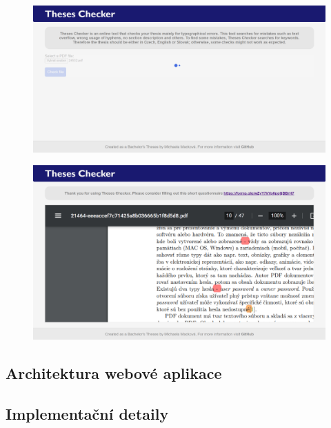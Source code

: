 \begin{figure}[H]
    \label{pic_theses_checker_page1_loading}
    \centering
    \includegraphics[width=\linewidth]{obrazky-figures/screenshot-loading.png}
    \caption{}
\end{figure}

\begin{figure}[H]
    \label{pic_theses_checker_page2}
    \centering
    \includegraphics[width=\linewidth]{obrazky-figures/screenshot-page2.png}
    \caption{}
\end{figure}


\subsection*{Architektura webové aplikace}


\dummyText[2]


\subsection*{Implementační detaily}

